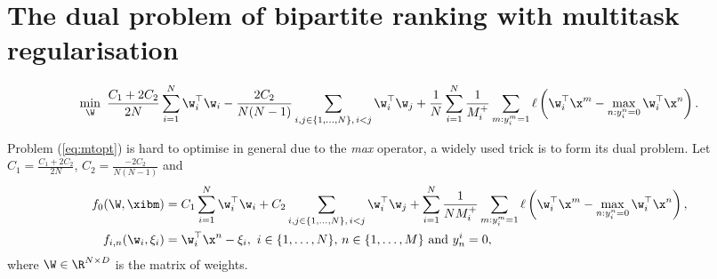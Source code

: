 \section{The dual problem of bipartite ranking with multitask regularisation}

\begin{equation}
\label{eq:mtopt}
\begin{aligned}
\min_{\W} \ \frac{C_1 + 2C_2}{2 N} \sum_{i=1}^{N} \w_i^\top \w_i 
- \frac{2C_2}{N (N - 1)} \sum_{i, j \in \{1,\dots,N\}, \, i < j} \w_i^\top \w_j
+ \frac{1}{N} \sum_{i = 1}^{N} \frac{1}{M_i^+} \sum_{m: y_i^m = 1} \ell \left( \w_i^\top \x^m - \max_{n: y_i^n = 0} \w_i^\top \x^n \right).
\end{aligned}
\end{equation}

Problem (\ref{eq:mtopt}) is hard to optimise in general due to the \emph{max} operator,
a widely used trick is to form its dual problem.
Let $C_1 = \frac{C_1 + 2C_2}{2 N}$, $C_2 = \frac{-2C_2}{N (N - 1)}$ and
\begin{equation*}
\begin{aligned}
f_0(\W, \xibm) &=  C_1 \sum_{i=1}^{N} \w_i^\top \w_i + C_2 \sum_{i, j \in \{1,\dots,N\}, \, i < j} \w_i^\top \w_j
    + \sum_{i = 1}^{N} \frac{1}{N M_i^+} \sum_{m: y_i^m = 1} \ell \left( \w_i^\top \x^m - \max_{n: y_i^n = 0} \w_i^\top \x^n \right), \\
f_{i,n}(\w_i, \xi_i) &= \w_i^\top \x^n - \xi_i, \ i \in \{1,\dots,N\}, \, n \in \{1,\dots,M\} \ \mathrm{and} \ y_n^i = 0,
\end{aligned}
\end{equation*}
where $\W \in \R^{N \times D}$ is the matrix of weights.

